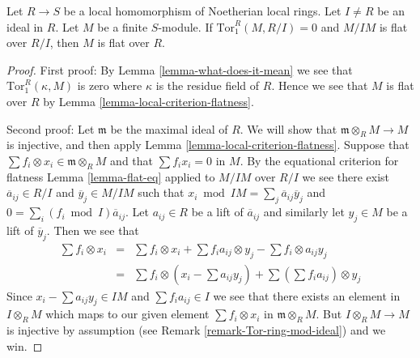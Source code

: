 \begin{lemma}
\label{lemma-variant-local-criterion-flatness}
Let $R \to S$ be a local homomorphism of Noetherian
local rings. Let $I \not = R$ be an ideal in $R$.
Let $M$ be a finite $S$-module. If $\text{Tor}_1^R(M, R/I) = 0$
and $M/IM$ is flat over $R/I$, then $M$ is flat over $R$.
\end{lemma}

\begin{proof}
First proof: By
Lemma \ref{lemma-what-does-it-mean}
we see that $\text{Tor}_1^R(\kappa, M)$ is zero where $\kappa$
is the residue field of $R$. Hence we see that $M$
is flat over $R$ by
Lemma \ref{lemma-local-criterion-flatness}.

\medskip\noindent
Second proof: Let $\mathfrak m$ be the maximal ideal of $R$.
We will show that $\mathfrak m \otimes_R M \to M$ is injective,
and then apply
Lemma \ref{lemma-local-criterion-flatness}.
Suppose that $\sum f_i \otimes x_i \in \mathfrak m \otimes_R M$
and that $\sum f_i x_i = 0$ in $M$. By the equational criterion
for flatness Lemma \ref{lemma-flat-eq} applied to $M/IM$
over $R/I$ we see there exist $\overline{a}_{ij} \in R/I$
and $\overline{y}_j \in M/IM$ such that
$x_i \bmod IM = \sum_j \overline{a}_{ij} \overline{y}_j $
and $0 = \sum_i (f_i \bmod I) \overline{a}_{ij}$.
Let $a_{ij} \in R$ be a lift of $\overline{a}_{ij}$ and
similarly let $y_j \in M$ be a lift of $\overline{y}_j$.
Then we see that
\begin{eqnarray*}
\sum f_i \otimes x_i
& = &
\sum f_i \otimes x_i +
\sum f_ia_{ij} \otimes y_j -
\sum f_i \otimes a_{ij} y_j
\\
& = &
\sum f_i \otimes (x_i - \sum a_{ij} y_j) +
\sum (\sum f_i a_{ij}) \otimes y_j
\end{eqnarray*}
Since $x_i - \sum a_{ij} y_j \in IM$ and
$\sum f_i a_{ij} \in I$ we see that there exists
an element in $I \otimes_R M$ which maps to our given
element $\sum f_i \otimes x_i$ in $\mathfrak m \otimes_R M$.
But $I \otimes_R M \to M$ is injective by assumption (see
Remark \ref{remark-Tor-ring-mod-ideal}) and we win.
\end{proof}
